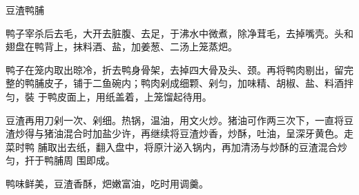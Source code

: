 \begin{recipe}{豆渣鸭脯}

\ingredients



\preparation

\step 鸭子宰杀后去毛，大开去脏腹、去足，于沸水中微煮，除净茸毛，去掉嘴壳。头和
翅盘在鸭背上，抹料酒、盐，加姜葱、二汤上笼蒸𤆵。

\step 鸭子在笼内取出晾冷，折去鸭身骨架，去掉四大骨及头、颈。再将鸭肉剔出，留完
整的鸭脯皮子，铺于二鱼碗内；鸭肉剁成细颗、剁匀，加味精、胡椒、盐、料酒拌匀，裝
于鸭皮面上，用纸盖着，上笼馏起待用。

\step 豆渣再用刀剁一次、剁细。热锅，温油，用文火炒。猪油可作两三次下，一直将豆
渣炒得与猪油混合时加盐少许，再继续将豆渣炒香，炒酥，吐油，呈深牙黄色。走菜时鸭
脯取出去纸，翻入盘中，将原汁泌入锅内，再加清汤与炒酥的豆渣混合炒匀，扞于鸭脯周
围即成。

\features

鸭味鲜美，豆渣香酥，𤆵嫩富油，吃时用调羹。

\end{recipe}

